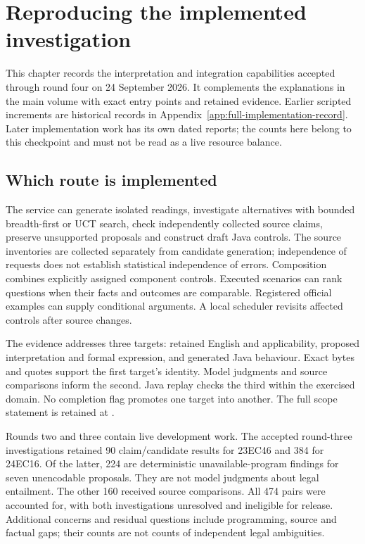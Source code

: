 \chapter{Reproducing the implemented investigation}
\label{app:current-interpretation}

This chapter records the interpretation and integration capabilities accepted
through round four on 24 September 2026. It complements the explanations in
the main volume with exact entry points and retained evidence. Earlier scripted
increments are historical records in Appendix~\ref{app:full-implementation-record}.
Later implementation work has its own dated reports; the counts here belong to
this checkpoint and must not be read as a live resource balance.

\section{Which route is implemented}

The service can generate isolated readings, investigate alternatives with bounded
breadth-first or UCT search, check independently collected source claims, preserve
unsupported proposals and construct draft Java controls. The source inventories
are collected separately from candidate generation; independence of requests
does not establish statistical independence of errors. Composition combines
explicitly assigned component controls. Executed scenarios can rank questions
when their facts and outcomes are comparable. Registered official examples can
supply conditional arguments. A local scheduler revisits affected controls after
source changes.

The evidence addresses three targets: retained English and applicability,
proposed interpretation and formal expression, and generated Java behaviour.
Exact bytes and quotes support the first target's identity. Model judgments
and source comparisons inform the second. Java replay checks the third within
the exercised domain. No completion flag promotes one target into another.
The full scope statement is retained at
.

Rounds two and three contain live development work. The accepted round-three
investigations retained 90 claim/candidate results for 23EC46 and 384 for 24EC16.
Of the latter, 224 are deterministic unavailable-program findings for seven
unencodable proposals. They are not model judgments about legal entailment.
The other 160 received source comparisons. All 474 pairs were accounted for,
with both investigations unresolved and ineligible for release. Additional
concerns and residual questions include programming, source and factual gaps;
their counts are not counts of independent legal ambiguities.

